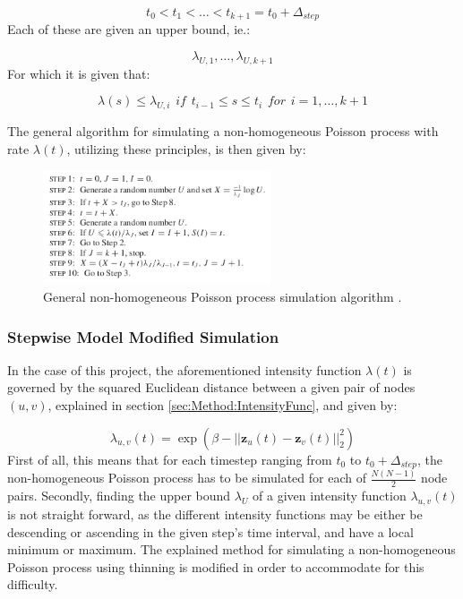 \begin{equation}
    t_0 < t_1 < \dots < t_{k+1} = t_0 + \Delta_{step}
\end{equation}
Each of these are given an upper bound, ie.:

\begin{equation}
    \lambda_{U,1}, \dots, \lambda_{U,k+1}
\end{equation}
For which it is given that:

\begin{equation}
    \lambda(s) \leq \lambda_{U,i} \hspace{5pt} if \hspace{5pt} t_{i-1} \leq s \leq t_i \hspace{5pt} for \hspace{5pt} i = 1,\dots,k+1
\end{equation}

The general algorithm for simulating a non-homogeneous Poisson process with rate $\lambda(t)$, utilizing these principles, is then given by:

\begin{figure}[H]
    \centering
    \includegraphics[width=0.6\textwidth]{0_images/nonHomogeneousAlgorithm.png}
    \caption{General non-homogeneous Poisson process simulation algorithm \cite{Ross2013GeneratingVariables}.}
    \label{fig:NonHomogeneousGeneralAlgorithm}
\end{figure}


\subsubsection{Stepwise Model Modified Simulation}
\label{sec:Method:PoissonSimulation:NonHomogeneousModified}
In the case of this project, the aforementioned intensity function $\lambda(t)$ is governed by the squared Euclidean distance between a given pair of nodes $(u,v)$, explained in section \ref{sec:Method:IntensityFunc}, and given by:

\begin{equation}
    \lambda_{u,v}(t)
    =
    \exp \left(\beta - ||\textbf{z}_u(t) - \textbf{z}_v(t)||_2^2\right)
    \label{eq:IntensityFunc2}
\end{equation}
\noindent
First of all, this means that for each timestep ranging from $t_0$ to $t_0 + \Delta_{step}$, the non-homogeneous Poisson process has to be simulated for each of $\frac{N(N-1)}{2}$ node pairs.
\noindent
Secondly, finding the upper bound $\lambda_U$ of a given intensity function $\lambda_{u,v}(t)$ is not straight forward, as the different intensity functions may be either be descending or ascending in the given step's time interval, and have a local minimum or maximum.
The explained method for simulating a non-homogeneous Poisson process using thinning is modified in order to accommodate for this difficulty.


